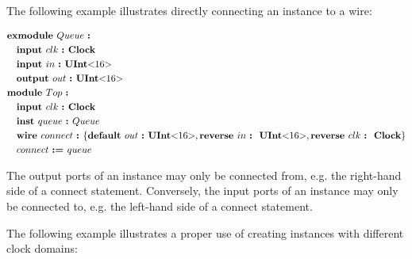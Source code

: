 \documentclass[12pt]{article}
\begin{document}
The following example illustrates directly connecting an instance to a wire:

{ \fontsize{11pt}{1.15em}\selectfont
\[
\begin{aligned}
&\kw{exmodule} Queue \ \kws{:} \\
&\quad \kw{input} clk  \ \kw{:} \kws{Clock} \\
&\quad \kw{input} in   \ \kw{:} \kws{UInt$<$}16\kws{$>$} \\
&\quad \kw{output} out \ \kw{:} \kws{UInt$<$}16\kws{$>$} \\
&\kw{module} Top \ \kws{:} \\
&\quad \kw{input} clk  \ \kw{:} \kws{Clock} \\
&\quad \kw{inst} queue \ \kw{:} Queue \\
&\quad \kw{wire} connect \ \kw{:} \bundleT{\kw{default} out \ \kw{:} \kws{UInt$<$}16\kws{$>$},\kw{reverse} in \ \kw{:} \ \kws{UInt$<$}16\kws{$>$},\kw{reverse} clk \ \kw{:} \ \kws{Clock}} \\
&\quad connect \ \kw{:=} queue \\
\end{aligned}
\]
}

The output ports of an instance may only be connected from, e.g. the right-hand side of a connect statement.
Conversely, the input ports of an instance may only be connected to, e.g. the left-hand side of a connect statement.

The following example illustrates a proper use of creating instances with different clock domains:
\end{document}
